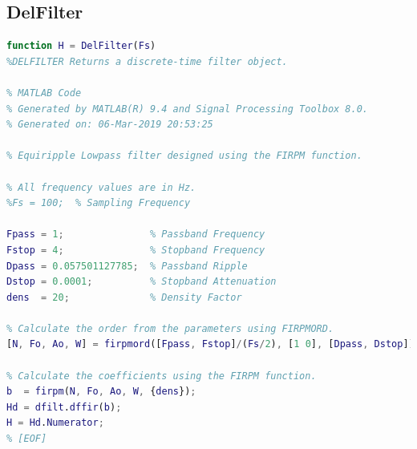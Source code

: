 \documentclass{article}
\begin{document}
\subsection{DelFilter}
\begin{lstlisting}[language = MATLAB]
function H = DelFilter(Fs)
%DELFILTER Returns a discrete-time filter object.

% MATLAB Code
% Generated by MATLAB(R) 9.4 and Signal Processing Toolbox 8.0.
% Generated on: 06-Mar-2019 20:53:25

% Equiripple Lowpass filter designed using the FIRPM function.

% All frequency values are in Hz.
%Fs = 100;  % Sampling Frequency

Fpass = 1;               % Passband Frequency
Fstop = 4;               % Stopband Frequency
Dpass = 0.057501127785;  % Passband Ripple
Dstop = 0.0001;          % Stopband Attenuation
dens  = 20;              % Density Factor

% Calculate the order from the parameters using FIRPMORD.
[N, Fo, Ao, W] = firpmord([Fpass, Fstop]/(Fs/2), [1 0], [Dpass, Dstop]);

% Calculate the coefficients using the FIRPM function.
b  = firpm(N, Fo, Ao, W, {dens});
Hd = dfilt.dffir(b);
H = Hd.Numerator;
% [EOF]
\end{lstlisting}
\end{document}
